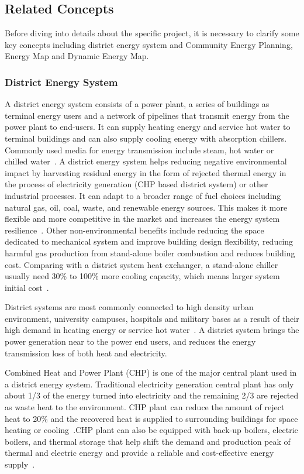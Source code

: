 \documentclass[hidelinks,12pt]{article}
\begin{document}
\subsection{Related Concepts}
Before diving into details about the specific project, it is necessary
to clarify some key concepts including district energy system and
Community Energy Planning, Energy Map and Dynamic Energy Map. 

\subsubsection{District Energy System}
A district energy system consists of a power plant, a series of
buildings as terminal energy users and a network of pipelines that
transmit energy from the power plant to end-users. It can supply
heating energy and service hot water to terminal buildings and can
also supply cooling energy with absorption chillers. Commonly used
media for energy transmission include steam, hot water or chilled
water~\cite{baird2014}. A district energy system helps reducing
negative environmental impact by harvesting residual energy in the
form of rejected thermal energy in the process of electricity
generation (CHP based district system) or other industrial
processes. It can adapt to a broader range of fuel choices including
natural gas, oil, coal, waste, and renewable energy sources. This
makes it more flexible and more competitive in the market and
increases the energy system resilience~\cite{IDEA2005}. Other
non-environmental benefits include reducing the space dedicated to
mechanical system and improve building design flexibility, reducing
harmful gas production from stand-alone boiler combustion and reduces
building cost. Comparing with a district system heat exchanger, a
stand-alone chiller usually need 30\% to 100\% more cooling capacity,
which means larger system initial cost~\cite{IDEA2005}.

District systems are most commonly connected to high density urban
environment, university campuses, hospitals and military bases as a
result of their high demand in heating energy or service hot
water~\cite{IDEA2005}. A district system brings the power generation
near to the power end users, and reduces the energy transmission loss
of both heat and electricity.

Combined Heat and Power Plant (CHP) is one of the major central plant
used in a district energy system. Traditional electricity generation
central plant has only about 1/3 of the energy turned into electricity
and the remaining 2/3 are rejected as waste heat to the
environment. CHP plant can reduce the amount of reject heat to 20\%
and the recovered heat is supplied to surrounding buildings for space
heating or cooling~\cite{IDEA2005}.CHP plant can also be equipped with
back-up boilers, electric boilers, and thermal storage that help shift
the demand and production peak of thermal and electric energy and
provide a reliable and cost-effective energy supply~\cite{IDEA2012}.
\end{document}
